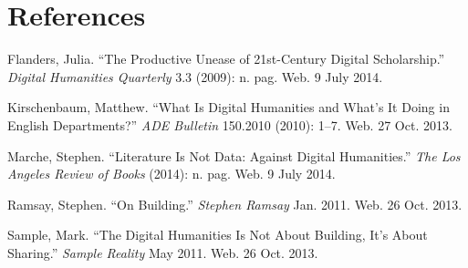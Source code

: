 \documentclass[]{article}
\begin{document}
\section*{References}\label{references}

Flanders, Julia. ``The Productive Unease of 21st-Century Digital
Scholarship.'' \emph{Digital Humanities Quarterly} 3.3 (2009): n. pag.
Web. 9 July 2014.

Kirschenbaum, Matthew. ``What Is Digital Humanities and What's It Doing
in English Departments?'' \emph{ADE Bulletin} 150.2010 (2010): 1--7.
Web. 27 Oct. 2013.

Marche, Stephen. ``Literature Is Not Data: Against Digital Humanities.''
\emph{The Los Angeles Review of Books} (2014): n. pag. Web. 9 July 2014.

Ramsay, Stephen. ``On Building.'' \emph{Stephen Ramsay} Jan. 2011. Web.
26 Oct. 2013.

Sample, Mark. ``The Digital Humanities Is Not About Building, It's About
Sharing.'' \emph{Sample Reality} May 2011. Web. 26 Oct. 2013.
\end{document}
